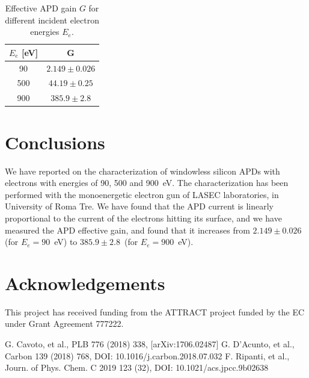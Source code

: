 \documentclass[12p]{paper}
\begin{document}
\begin{table}
\centering
\begin{tabular}{cc}
\hline
$E_{e}$ [eV] & G \\
\hline
90 & $2.149 \pm 0.026$ \\
500 & $44.19 \pm 0.25$ \\
900 & $385.9 \pm 2.8$ \\
\hline
\end{tabular}
\caption{Effective APD gain $G$ for different incident electron energies $E_e$.
\label{tab:G}}
\end{table}





\section{Conclusions}

We have reported on the characterization of windowless silicon APDs with electrons with energies of 90, 500 and 900~eV. The characterization has been performed with the monoenergetic electron gun of LASEC laboratories, in University of Roma Tre. We have found that the APD current is linearly proportional to the current of the electrons hitting its surface, and we have measured the APD effective gain, and found that it increases from $2.149 \pm 0.026$ (for $E_e = 90$~eV) to $385.9 \pm 2.8$~(for $E_e = 900$~eV).

\section*{Acknowledgements}

This project has received funding from the ATTRACT project funded by the EC under Grant Agreement 777222.

\begin{thebibliography}{99}


 G. Cavoto, et al., PLB 776 (2018) 338, [arXiv:1706.02487]
 G. D'Acunto, et al., Carbon 139 (2018) 768, DOI: 10.1016/j.carbon.2018.07.032
 F. Ripanti, et al., Journ. of Phys. Chem. C 2019 123 (32), DOI: 10.1021/acs.jpcc.9b02638

\end{thebibliography}
\end{document}
